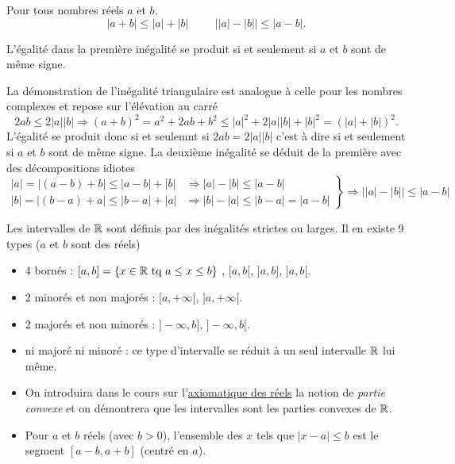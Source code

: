 \begin{prop} Pour tous nombres réels $a$ et $b$.
  \begin{displaymath}
    |a + b| \leq |a| + |b| \hspace{1cm} \left| |a| - |b| \right| \leq |a-b|.
  \end{displaymath}
\end{prop}
L'égalité dans la première inégalité se produit si et seulement si $a$ et $b$ sont de même signe.
\begin{demo}
  La démonstration de l'inégalité triangulaire est analogue à celle pour les nombres complexes et repose sur l'élévation au carré
\begin{displaymath}
  2ab \leq 2|a||b| \Rightarrow (a+b)^2 = a^2 + 2ab + b^2 \leq |a|^2 + 2|a||b| + |b|^2 = (|a| + |b|)^2 .
\end{displaymath}
L'égalité se produit donc si et seulemnt si $2ab = 2|a||b|$ c'est à dire si et seulement si $a$ et $b$ sont de même signe.\newline
La deuxième inégalité se déduit de la première avec des décompositions idiotes
\begin{displaymath}
  \left. 
  \begin{aligned}
    |a| = |(a-b)+b|\leq |a-b| + |b| &\Rightarrow |a| - |b| \leq |a-b| \\
    |b| = |(b-a)+a|\leq |b-a| + |a| &\Rightarrow |b| - |a| \leq |b-a|= |a-b| 
  \end{aligned}
\right\rbrace \Rightarrow \left| |a| - |b|\right| \leq |a-b|
\end{displaymath}
\end{demo}
Les intervalles de $\mathbb{R}$  sont définis par des inégalités strictes ou larges. Il en existe 9 types ($a$ et $b$ sont des réels)
\begin{itemize}
 \item 4 bornés : $[a,b]=\left\lbrace x\in \mathbb{R} \text{ tq } a\leq x \leq b\right\rbrace$ , $[a,b[$, $]a,b]$, $]a,b[$.
 \item 2 minorés et non majorés : $[a, +\infty[$, $]a,+\infty[$.
 \item 2 majorés et non minorés : $]-\infty,b]$, $]-\infty,b[$.
 \item ni majoré ni minoré : ce type d'intervalle se réduit à un seul intervalle $\mathbb{R}$ lui même. 
\end{itemize}

\begin{rems}
 \begin{itemize}
  \item {}On introduira dans le cours sur l'\href{\baseurl C2192.pdf}{axiomatique des réels} la notion de \emph{partie convexe} et on démontrera que les intervalles sont les parties convexes de $\mathbb{R}$.
  \item Pour $a$ et $b$ réels (avec $b>0$), l'ensemble des $x$ tels que $|x-a|\leq b$ est le segment $[a-b, a+b]$ (centré en $a$).
 \end{itemize}
\end{rems}

